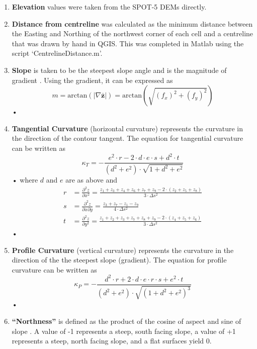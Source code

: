 \documentclass[12pt]{article}
\begin{document}
\begin{enumerate}
\item[]\textbf{Elevation} values were taken from the SPOT-5 DEMs directly.

\item[] \textbf{Distance from centreline} was calculated as the minimum distance between the Easting and Northing of the northwest corner of each cell and a centreline that was drawn by hand in QGIS. This was completed in Matlab using the script `CentrelineDistance.m'. 

\item[]  \textbf{Slope} is taken to be the steepest slope angle and is the magnitude of gradient \citep{Mitavsova1993}. Using the gradient, it can be expressed as 
	\begin{equation}
	m = \textrm{arctan}(|\nabla \bar{ \bm{z}}|) = \textrm{arctan} \left( \sqrt{(f_x)^2 +( f_y)^2} \right)
	\end{equation}•
\item[] \textbf{Tangential Curvature} (horizontal curvature) represents the curvature in the direction of the contour tangent. The equation for tangential curvature can be written as
	\begin{equation}
	\kappa_T = - \frac{e^2 \cdot r -2 \cdot d\cdot e \cdot s +d^2 \cdot t}{(d^2+e^2) \cdot \sqrt{1+d^2+e^2}}
	\end{equation}•
where $d$ and $e$ are as above and
	\begin{align}
	r &= \frac{\partial^2 z}{\partial x^2} = \frac{z_1+z_3+z_4+z_6+z_7+z_9-2 \cdot (z_2+z_5+z_8)}{3 \cdot \Delta s^2}\\
	s &= \frac{\partial^2 z}{\partial x \partial y} = \frac{z_3 + z_7- z_1 - z_9}{4 \cdot \Delta s^2}\\
	t &= \frac{\partial^2 z}{\partial y^2} = \frac{z_1+z_2+z_3+z_7+z_8+z_9-2 \cdot (z_4+z_5+z_6)}{3 \cdot \Delta s^2}
	\end{align}•	

\item[] \textbf{Profile Curvature} (vertical curvature) represents the curvature in the direction of the the steepest slope (gradient). The equation for profile curvature can be written as
	\begin{equation}
	\kappa_P = - \frac{d^2 \cdot r +2 \cdot d\cdot e \cdot r \cdot s +e^2 \cdot t}{(d^2+e^2) \cdot \sqrt{(1+d^2+e^2)^3}}
	\end{equation}•

\item[] \textbf{``Northness''} is defined as the product of the cosine of aspect and sine of slope \citep{Molotch2005}. A value of -1 represents a steep, south facing slope, a value of +1 represents a steep, north facing slope, and a flat surfaces yield 0. 


\end{enumerate}
\end{document}
